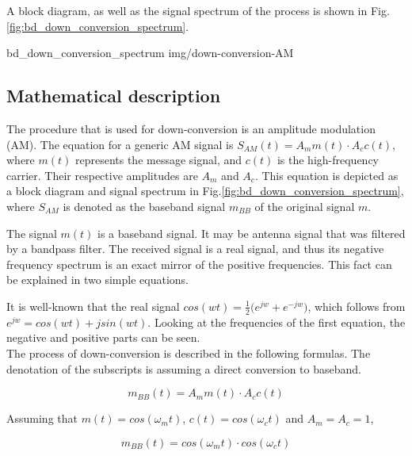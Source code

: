 A block diagram, as well as the signal spectrum of the process is shown in Fig.\ref{fig:bd_down_conversion_spectrum}.

 {bd_down_conversion_spectrum} {img/down-conversion-AM}

\subsection{Mathematical description}

The procedure that is used for down-conversion is an amplitude modulation (AM).
The equation for a generic AM signal is $ S_{AM}(t) = A_m m(t) \cdot A_c c(t) $, where $m(t)$ represents the message signal, and $c(t)$ is the high-frequency carrier.
Their respective amplitudes are $A_m$ and $A_c$.
This equation is depicted as a block diagram and signal spectrum in Fig.\ref{fig:bd_down_conversion_spectrum}, where $S_{AM}$ is denoted as the baseband signal $m_{BB}$ of the original signal $m$.

The signal $m(t)$ is a baseband signal.
It may be antenna signal that was filtered by a bandpass filter.
The received signal is a real signal, and thus its negative frequency spectrum is an exact mirror of the positive frequencies.
This fact can be explained in two simple equations.

It is well-known that the real signal $cos(wt) = \frac{1}{2} \Big( e^{jw} + e^{-jw} \Big)$, which follows from $e^{jw} = cos(wt)+jsin(wt)$.
Looking at the frequencies of the first equation, the negative and positive parts can be seen.\\

The process of down-conversion is described in the following formulas.
The denotation of the subscripts is assuming a direct conversion to baseband.

\begin{equation}
  m_{BB}(t) = A_m m(t) \cdot A_c c(t)
\end{equation}

Assuming that $m(t) = cos(\omega_mt)$, $c(t) = cos(\omega_ct)$ and $A_m = A_c = 1$,

\begin{equation}
  m_{BB}(t) = cos(\omega_mt) \cdot cos(\omega_ct)
\end{equation}

